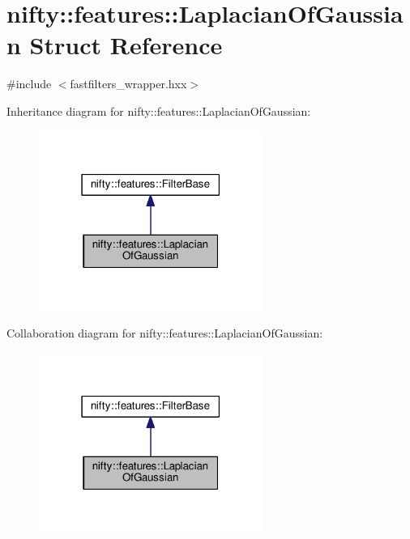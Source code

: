 \hypertarget{structnifty_1_1features_1_1LaplacianOfGaussian}{}\section{nifty\+:\+:features\+:\+:Laplacian\+Of\+Gaussian Struct Reference}
\label{structnifty_1_1features_1_1LaplacianOfGaussian}


{\ttfamily \#include $<$fastfilters\+\_\+wrapper.\+hxx$>$}



Inheritance diagram for nifty\+:\+:features\+:\+:Laplacian\+Of\+Gaussian\+:\nopagebreak
\begin{figure}[H]
\begin{center}
\leavevmode
\includegraphics[width=207pt]{structnifty_1_1features_1_1LaplacianOfGaussian__inherit__graph}
\end{center}
\end{figure}


Collaboration diagram for nifty\+:\+:features\+:\+:Laplacian\+Of\+Gaussian\+:\nopagebreak
\begin{figure}[H]
\begin{center}
\leavevmode
\includegraphics[width=207pt]{structnifty_1_1features_1_1LaplacianOfGaussian__coll__graph}
\end{center}
\end{figure}
